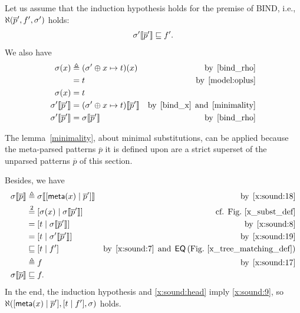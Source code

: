 \begin{enumerate}
\begin{enumerate}
        \end{enumerate}
        Let us assume that the induction hypothesis holds for the
        premise of \textsf{BIND}, i.e., \(\ind{R}(\overline{p}', f',
        \sigma')\) holds:
        \begin{gather}
          \subst{\overline{p}'}{\sigma'} \sqsubseteq f'.
          \label{x:sound:7}
        \end{gather}
        We also have
        \begin{align}
           \sigma(x)
          &\triangleq (\sigma' \oplus x \mapsto t)(x)
          &\text{by} \,\; \text{\ref{bind_rho}}\notag\\
          &= t
          &\text{by} \,\; \eqref{model:oplus}\notag\\
           \sigma(x)
          &= t \label{x:sound:8}\\
           \subst{\overline{p}'}{\sigma'}
           &= \subst{\overline{p}'}{(\sigma' \oplus x \mapsto t)}
           &\text{by} \,\; \text{\ref{bind_x}} \,\; \text{and} \,\;
           \text{\ref{minimality}}\notag\\
           \subst{\overline{p}'}{\sigma'}
           &= \subst{\overline{p}'}{\sigma}
           &\text{by} \,\; \text{\ref{bind_rho}} \label{x:sound:19}
        \end{align}
        \begin{remark}
          The lemma~\ref{minimality}, about minimal substitutions, can
          be applied because the meta\hyp{}parsed patterns
          \(\overline{p}\) it is defined upon are a strict superset of
          the unparsed patterns \(\overline{p}\) of this section.
        \end{remark}
        Besides, we have
        \begin{align}
           \subst{\overline{p}}{\sigma}
        &\triangleq \subst{\cons{\meta{x}}{\overline{p}'}}{\sigma}
        &\text{by} \,\; \text{\ref{x:sound:18}}\notag\\
        &\eqn{2} \cons{\sigma(x)}{\subst{\overline{p}'}{\sigma}}\notag
        &\text{cf. Fig.~\ref{x_subst_def}}\\
        &= \cons{t}{\subst{\overline{p}'}{\sigma}}
        &\text{by} \,\; \eqref{x:sound:8}\notag\\
        &= \cons{t}{\subst{\overline{p}'}{\sigma'}}
        &\text{by} \,\; \eqref{x:sound:19}\notag\\
        &\sqsubseteq \cons{t}{f'}
        &\text{by} \,\; \eqref{x:sound:7} \,\; \text{and} \,\;
           \textsf{EQ} \, \text{(Fig.~\ref{x_tree_matching_def})}\notag\\
        &\triangleq f
        &\text{by} \,\; \text{\ref{x:sound:17}}\notag\\
           \subst{\overline{p}}{\sigma}
        &\sqsubseteq f. \label{x:sound:9}
        \end{align}
        In the end, the induction hypothesis and \eqref{x:sound:head}
        imply \eqref{x:sound:9}, so
        \(\ind{R}(\cons{\meta{x}}{\overline{p}'}, \cons{t}{f'},
        \sigma)\) holds.


\end{enumerate}
